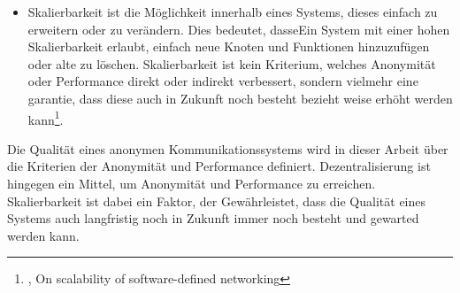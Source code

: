 \begin{itemize}
\item Skalierbarkeit ist die Möglichkeit innerhalb eines Systems, dieses einfach zu erweitern oder zu verändern. Dies bedeutet, dasseEin System mit einer hohen Skalierbarkeit erlaubt, einfach neue Knoten und Funktionen hinzuzufügen oder alte zu löschen. Skalierbarkeit ist kein Kriterium, welches Anonymität oder Performance direkt oder indirekt verbessert, sondern vielmehr eine garantie, dass diese auch in Zukunft noch besteht bezieht weise erhöht werden kann\footnote{\cite{ScalabilityOfNetworking}, On scalability of software-defined networking}.

\end{itemize}

Die Qualität eines anonymen Kommunikationssystems wird in dieser Arbeit über die Kriterien der Anonymität und Performance definiert. Dezentralisierung ist hingegen ein Mittel, um Anonymität und Performance zu erreichen. Skalierbarkeit ist dabei ein Faktor, der Gewährleistet, dass die Qualität eines Systems auch langfristig noch in Zukunft immer noch besteht und gewarted werden kann.